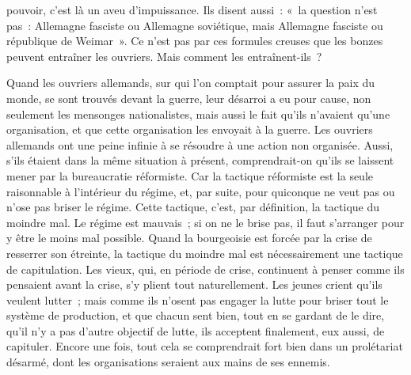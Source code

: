\documentclass[french,twoside]{book} %
\begin{document}
pouvoir, c'est là un aveu d'impuissance. Ils disent aussi : « la question n'est pas : Allemagne fas­ciste ou Allemagne soviétique, mais Allemagne fasciste ou république de Weimar ». Ce n'est pas par ces formules creuses que les bonzes peuvent entraîner les ouvriers. Mais comment les entraînent-ils ?\par
Quand les ouvriers allemands, sur qui l'on comptait pour assurer la paix du monde, se sont trouvés devant la guerre, leur désarroi a eu pour cause, non seulement les mensonges nationalistes, mais aussi le fait qu'ils n'avaient qu'une organisation, et que cette organisation les envoyait à la guerre. Les ouvriers allemands ont une peine infinie à se résoudre à une action non orga­nisée. Aussi, s'ils étaient dans la même situation à présent, comprendrait-on qu'ils se laissent mener par la bureaucratie réformiste. Car la tactique réformiste est la seule raisonnable à l'intérieur du régime, et, par suite, pour quiconque ne veut pas ou n'ose pas briser le régime. Cette tactique, c'est, par définition, la tactique du moindre mal. Le régime est mauvais ; si on ne le brise pas, il faut s'arranger pour y être le moins mal possible. Quand la bourgeoisie est forcée par la crise de resserrer son étreinte, la tactique du moindre mal est nécessairement une tactique de capitulation. Les vieux, qui, en période de crise, continuent à penser comme ils pensaient avant la crise, s'y plient tout naturellement. Les jeunes crient qu'ils veulent lutter ; mais comme ils n'osent pas engager la lutte pour briser tout le système de production, et que chacun sent bien, tout en se gardant de le dire, qu'il n'y a pas d'autre objectif de lutte, ils acceptent finalement, eux aussi, de capituler. Encore une fois, tout cela se comprendrait fort bien dans un prolétariat désarmé, dont les organisations seraient aux mains de ses ennemis.\par
\end{document}
